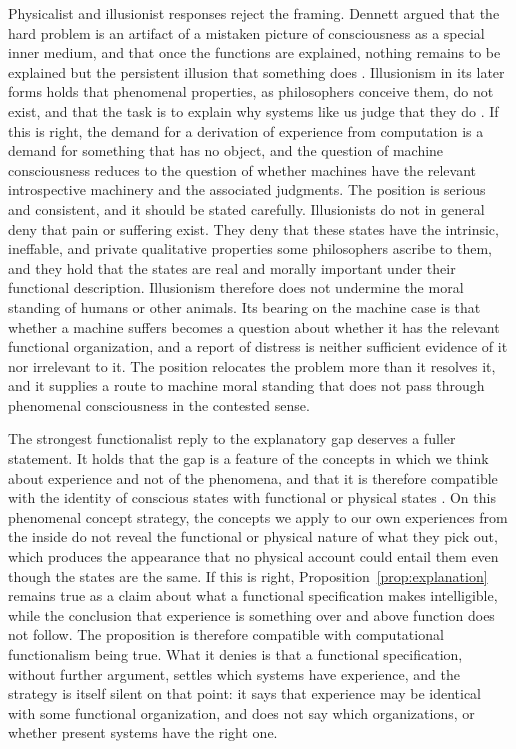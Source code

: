 \documentclass[12pt]{article}
\theoremstyle{definition}
\begin{document}
Physicalist and illusionist responses reject the framing. Dennett argued that the hard problem is an artifact of a mistaken picture of consciousness as a special inner medium, and that once the functions are explained, nothing remains to be explained but the persistent illusion that something does \cite{dennett1991}. Illusionism in its later forms holds that phenomenal properties, as philosophers conceive them, do not exist, and that the task is to explain why systems like us judge that they do \cite{frankish2016}. If this is right, the demand for a derivation of experience from computation is a demand for something that has no object, and the question of machine consciousness reduces to the question of whether machines have the relevant introspective machinery and the associated judgments. The position is serious and consistent, and it should be stated carefully. Illusionists do not in general deny that pain or suffering exist. They deny that these states have the intrinsic, ineffable, and private qualitative properties some philosophers ascribe to them, and they hold that the states are real and morally important under their functional description. Illusionism therefore does not undermine the moral standing of humans or other animals. Its bearing on the machine case is that whether a machine suffers becomes a question about whether it has the relevant functional organization, and a report of distress is neither sufficient evidence of it nor irrelevant to it. The position relocates the problem more than it resolves it, and it supplies a route to machine moral standing that does not pass through phenomenal consciousness in the contested sense.

The strongest functionalist reply to the explanatory gap deserves a fuller statement. It holds that the gap is a feature of the concepts in which we think about experience and not of the phenomena, and that it is therefore compatible with the identity of conscious states with functional or physical states \cite{loar1990,papineau2002}. On this phenomenal concept strategy, the concepts we apply to our own experiences from the inside do not reveal the functional or physical nature of what they pick out, which produces the appearance that no physical account could entail them even though the states are the same. If this is right, Proposition~\ref{prop:explanation} remains true as a claim about what a functional specification makes intelligible, while the conclusion that experience is something over and above function does not follow. The proposition is therefore compatible with computational functionalism being true. What it denies is that a functional specification, without further argument, settles which systems have experience, and the strategy is itself silent on that point: it says that experience may be identical with some functional organization, and does not say which organizations, or whether present systems have the right one.
\end{document}
